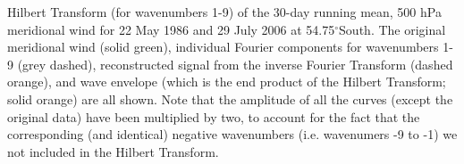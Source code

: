 \label{fig:example_hilbert}
Hilbert Transform (for wavenumbers 1-9) of the 30-day running mean, 500 hPa meridional wind for 22 May 1986 and 29 July 2006 at 54.75$^{\circ}$South. The original meridional wind (solid green), individual Fourier components for wavenumbers 1-9 (grey dashed), reconstructed signal from the inverse Fourier Transform (dashed orange), and wave envelope (which is the end product of the Hilbert Transform; solid orange) are all shown. Note that the amplitude of all the curves (except the original data) have been multiplied by two, to account for the fact that the corresponding (and identical) negative wavenumbers (i.e. wavenumers -9 to -1) we not included in the Hilbert Transform. 